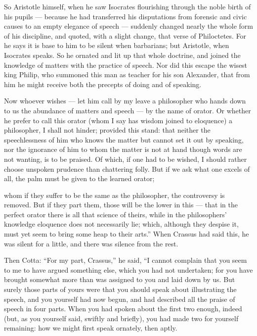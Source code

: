  So Aristotle himself, when he saw Isocrates flourishing through the noble birth of his pupils — because he had transferred his disputations from forensic and civic causes to an empty elegance of speech — suddenly changed nearly the whole form of his discipline, and quoted, with a slight change, that verse of Philoctetes. For he says it is base to him to be silent when barbarians; but Aristotle, when Isocrates speaks. So he ornated and lit up that whole doctrine, and joined the knowledge of matters with the practice of speech. Nor did this escape the wisest king Philip, who summoned this man as teacher for his son Alexander, that from him he might receive both the precepts of doing and of speaking.

 Now whoever wishes — let him call by my leave a philosopher who hands down to us the abundance of matters and speech — by the name of orator. Or whether he prefer to call this orator (whom I say has wisdom joined to eloquence) a philosopher, I shall not hinder; provided this stand: that neither the speechlessness of him who knows the matter but cannot set it out by speaking, nor the ignorance of him to whom the matter is not at hand though words are not wanting, is to be praised. Of which, if one had to be wished, I should rather choose unspoken prudence than chattering folly. But if we ask what one excels of all, the palm must be given to the learned orator;

 whom if they suffer to be the same as the philosopher, the controversy is removed. But if they part them, those will be the lower in this — that in the perfect orator there is all that science of theirs, while in the philosophers' knowledge eloquence does not necessarily lie; which, although they despise it, must yet seem to bring some heap to their arts.'' When Crassus had said this, he was silent for a little, and there was silence from the rest.

 Then Cotta: ``For my part, Crassus,'' he said, ``I cannot complain that you seem to me to have argued something else, which you had not undertaken; for you have brought somewhat more than was assigned to you and laid down by us. But surely those parts of yours were that you should speak about illustrating the speech, and you yourself had now begun, and had described all the praise of speech in four parts. When you had spoken about the first two enough, indeed (but, as you yourself said, swiftly and briefly), you had made two for yourself remaining: how we might first speak ornately, then aptly.

